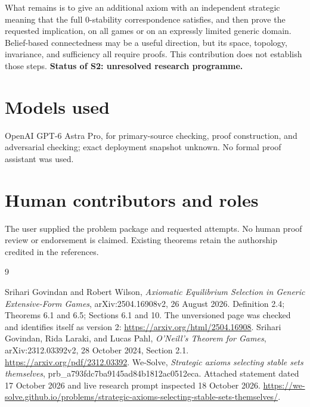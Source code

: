 \documentclass[11pt]{article}
\begin{document}
What remains is to give an additional axiom with an independent strategic meaning that the full $0$-stability correspondence satisfies, and then prove the requested implication, on all games or on an expressly limited generic domain. Belief-based connectedness may be a useful direction, but its space, topology, invariance, and sufficiency all require proofs. This contribution does not establish those steps. \textbf{Status of S2: unresolved research programme.}

\section*{Models used}
OpenAI GPT-6 Astra Pro, for primary-source checking, proof construction, and adversarial checking; exact deployment snapshot unknown. No formal proof assistant was used.
\section*{Human contributors and roles}
The user supplied the problem package and requested attempts. No human proof review or endorsement is claimed. Existing theorems retain the authorship credited in the references.

\begin{thebibliography}{9}
\raggedright
{} Srihari Govindan and Robert Wilson,
\emph{Axiomatic Equilibrium Selection in Generic Extensive-Form Games},
arXiv:2504.16908v2, 26 August 2026.
Definition 2.4; Theorems 6.1 and 6.5; Sections 6.1 and 10.
The unversioned page was checked and identifies itself as version 2:
\url{https://arxiv.org/html/2504.16908}.
 Srihari Govindan, Rida Laraki, and Lucas Pahl,
\emph{O'Neill's Theorem for Games}, arXiv:2312.03392v2,
28 October 2024, Section 2.1.
\url{https://arxiv.org/pdf/2312.03392}.
 We-Solve, \emph{Strategic axioms selecting stable sets themselves}, prb_a793fdc7ba9145ad84b1812ac0512eca.
Attached statement dated 17 October 2026 and live research prompt inspected
18 October 2026.
\url{https://we-solve.github.io/problems/strategic-axioms-selecting-stable-sets-themselves/}.
\end{thebibliography}
\end{document}
